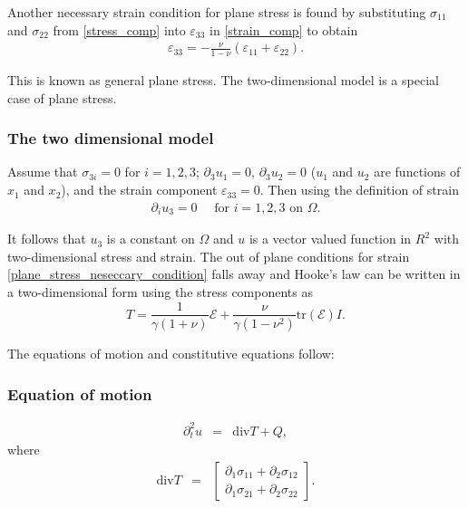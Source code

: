 			Another necessary strain condition for plane stress is found by substituting
			$\sigma_{11}$ and $\sigma_{22}$ from \eqref{stress_comp} into
			$\varepsilon_{33}$ in \eqref{strain_comp} to obtain
			\begin{eqnarray}
				\varepsilon_{33} = -\frac{\nu}{1-\nu} (\varepsilon_{11} + \varepsilon_{22}).\label{plane_stress_neseccary_condition}
			\end{eqnarray}

			This is known as general plane stress. The two-dimensional model is a special case of plane stress.

		\subsubsection*{The two dimensional model}
			Assume that $\sigma_{3i} = 0$ for $i = 1, 2, 3$; $\partial_3 u_1 = 0$, $\partial_3 u_2 = 0$ ($u_1$ and $u_2$ are functions of $x_1$ and $x_2$), and the strain component $\varepsilon_{33} = 0$. Then using the definition of strain 
			\begin{eqnarray}
				\partial_i u_3 = 0 \quad \textrm{ for } i = 1,2,3 \textrm{ on } \Omega.
			\end{eqnarray}

			It follows that $u_3$ is a constant on $\Omega$ and $u$ is a vector valued function in 
			$R^2$ with two-dimensional stress and strain. The out of plane conditions for strain 
			\eqref{plane_stress_neseccary_condition} falls away and Hooke’s law can be written in a 
			two-dimensional form using the stress components as 
			\[ T = \frac{1}{\gamma(1+\nu)}\mathcal{E} + \frac{\nu}{\gamma(1-\nu^2)}\textrm{tr}(\mathcal{E})I.\]

			The equations of motion and constitutive equations follow:
			\subsubsection*{Equation of motion}\label{sssec:2D_Model:EquationOfMotion}
			\begin{eqnarray}
				\partial_t^2 u & = & \textrm{div}T + Q, \label{eq:2D_Model:EM}
			\end{eqnarray}
			where
			\begin{eqnarray}
				\textrm{div} T & = &
				\begin{bmatrix}
					\partial_1 \sigma_{11} + \partial_2 \sigma_{12} \\
					\partial_1 \sigma_{21} + \partial_2 \sigma_{22}
				\end{bmatrix}. \label{eq:2D_Model:DivT}
			\end{eqnarray}
